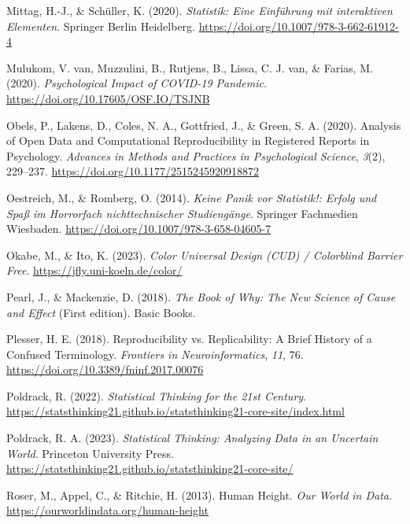 \documentclass[
  letterpaper,
]{scrbook}
\newlength{\cslhangindent}
\newenvironment{CSLReferences}[2] %
 {\begin{list}{}{%
  \setlength{\itemindent}{0pt}
  \setlength{\leftmargin}{0pt}
  \setlength{\parsep}{0pt}
  \ifodd #1
   \setlength{\leftmargin}{\cslhangindent}
   \setlength{\itemindent}{-1\cslhangindent}
  \fi
  \setlength{\itemsep}{#2\baselineskip}}}
 {\end{list}}
\theoremstyle{definition}
\theoremstyle{definition}
\theoremstyle{definition}
\theoremstyle{remark}
\begin{document}
\begin{CSLReferences}{1}{0}
Mittag, H.-J., \& Schüller, K. (2020). \emph{Statistik: Eine Einführung
mit interaktiven Elementen}. Springer Berlin Heidelberg.
\url{https://doi.org/10.1007/978-3-662-61912-4}

Mulukom, V. van, Muzzulini, B., Rutjens, B., Lissa, C. J. van, \&
Farias, M. (2020). \emph{Psychological Impact of {COVID-19} Pandemic}.
\url{https://doi.org/10.17605/OSF.IO/TSJNB}

Obels, P., Lakens, D., Coles, N. A., Gottfried, J., \& Green, S. A.
(2020). Analysis of {Open Data} and {Computational Reproducibility} in
{Registered Reports} in {Psychology}. \emph{Advances in Methods and
Practices in Psychological Science}, \emph{3}(2), 229--237.
\url{https://doi.org/10.1177/2515245920918872}

Oestreich, M., \& Romberg, O. (2014). \emph{Keine Panik vor Statistik!:
Erfolg und Spaß im Horrorfach nichttechnischer Studiengänge}. Springer
Fachmedien Wiesbaden. \url{https://doi.org/10.1007/978-3-658-04605-7}

Okabe, M., \& Ito, K. (2023). \emph{Color {Universal Design} ({CUD}) /
{Colorblind Barrier Free}}. \url{https://jfly.uni-koeln.de/color/}

Pearl, J., \& Mackenzie, D. (2018). \emph{The Book of Why: The New
Science of Cause and Effect} (First edition). Basic Books.

Plesser, H. E. (2018). Reproducibility vs. {Replicability}: {A Brief
History} of a {Confused Terminology}. \emph{Frontiers in
Neuroinformatics}, \emph{11}, 76.
\url{https://doi.org/10.3389/fninf.2017.00076}

Poldrack, R. (2022). \emph{Statistical {Thinking} for the 21st
{Century}}.
\url{https://statsthinking21.github.io/statsthinking21-core-site/index.html}

Poldrack, R. A. (2023). \emph{Statistical Thinking: Analyzing Data in an
Uncertain World}. Princeton University Press.
\url{https://statsthinking21.github.io/statsthinking21-core-site/}

Roser, M., Appel, C., \& Ritchie, H. (2013). Human Height. \emph{Our
World in Data}. \url{https://ourworldindata.org/human-height}


\end{CSLReferences}
\end{document}
